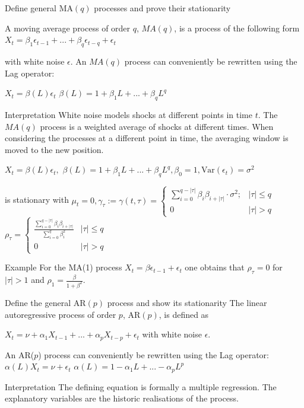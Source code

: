 Define general \( \text{MA}(q) \) processes and prove their stationarity

A moving average process of order \(q\), \(MA(q)\), is a process of the following form
\(X_t = \beta_1 \epsilon_{t - 1} + ... + \beta_q \epsilon_{t - q} + \epsilon_t\)

with white noise \(\epsilon\).
An \(MA(q)\) process can conveniently be rewritten using the Lag operator:

\(X_t = \beta(L) \epsilon_t\)
\(\beta(L) = 1 + \beta_1 L + ... + \beta_q L^q\)

Interpretation
White noise models shocks at different points in time \(t\).
The \(MA(q)\) process is a weighted average of shocks at different times. 
When considering the processes at a different point in time, the averaging window is moved to the new position.

\(X_t = \beta(L) \epsilon_t,\)
\(\beta(L) = 1 + \beta_1 L + ... + \beta_q L^q, \beta_0 = 1, \text{Var}(\epsilon_t) = \sigma^2\)

is stationary with
\(\mu_t = 0, \gamma_\tau := \gamma(t, \tau) = \begin{cases} \sum_{i = 0}^{q - |\tau|} \beta_i \beta_{i + |\tau|} \cdot \sigma^2; & |\tau| \le q \\ 0 & |\tau| > q \end{cases}\)
\(\rho_\tau = \begin{cases} \frac{\sum_{i = 0}^{q - |\tau|} \beta_i \beta_{i + |\tau|}}{\sum_{i = 0}^q \beta_i^2} & |\tau| \le q \\ 0 & |\tau| > q \end{cases}\)

Example
For the MA(1) process
\(X_t = \beta \epsilon_{t - 1} + \epsilon_t\)
one obtains that \(\rho_\tau = 0\) for \(|\tau| > 1\) and \(\rho_1 = \frac{\beta}{1 + \beta^2}\).


Define the general \( \text{AR}(p) \) process and show its stationarity
The linear autoregressive process of order \(p\), \( \text{AR}(p) \), is defined as

\(X_t = \nu + \alpha_1 X_{t - 1} + ... + \alpha_p X_{t - p} + \epsilon_t\)
with white noise \(\epsilon\).

An AR(\(p\)) process can conveniently be rewritten using the Lag operator:
\(\alpha(L)X_t = \nu + \epsilon_t\)
\(\alpha(L) = 1 - \alpha_1 L + ... - \alpha_p L^p\)

Interpretation
The defining equation is formally a multiple regression.
The explanatory variables are the historic realisations of the process.


